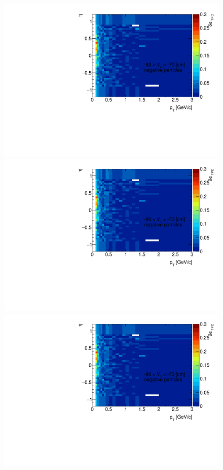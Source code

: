 \begin{figure}[H]
{		\includegraphics[width=\linewidth,page=22]{graphics/systematicsEfficiency/deadMaterial/secondaries_Unbinned_Charged_CD.pdf}\\
		\includegraphics[width=\linewidth,page=25]{graphics/systematicsEfficiency/deadMaterial/secondaries_Unbinned_Charged_CD.pdf}\\
		\includegraphics[width=\linewidth,page=28]{graphics/systematicsEfficiency/deadMaterial/secondaries_Unbinned_Charged_CD.pdf}
}
\end{figure}

